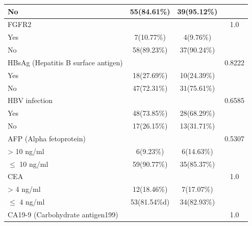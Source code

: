 \documentclass[num-refs]{wiley-article}
\begin{document}
\begin{table}[]
\begin{center}
\begin{tabular}{|l|c|c|c|}
\quad No                                             & 55(84.61\%)  & 39(95.12\%) &                         \\ \hline
FGFR2                                          &              &             & 1.0      \\ \cline{1-3}
\quad Yes                                            & 7(10.77\%)   & 4(9.76\%)   &                         \\ \cline{1-3}
\quad No                                             & 58(89.23\%)  & 37(90.24\%) &                         \\ \hline
HBsAg (Hepatitis B surface antigen)            &              &             & 0.8222 \\ \cline{1-3}
\quad Yes                                            & 18(27.69\%)  & 10(24.39\%) &                         \\ \cline{1-3}
\quad No                                             & 47(72.31\%)  & 31(75.61\%) &                         \\ \hline
HBV infection                                  &              &             & 0.6585 \\ \cline{1-3}
\quad Yes                                            & 48(73.85\%)  & 28(68.29\%) &                         \\ \cline{1-3}
\quad No                                             & 17(26.15\%)  & 13(31.71\%) &                         \\ \hline
AFP (Alpha   fetoprotein)                      &              &             & 0.5307 \\ \cline{1-3}
\quad \textgreater{} 10 ng/ml                         & 6(9.23\%)    & 6(14.63\%)  &                         \\ \cline{1-3}
\quad $\leq$ 10 ng/ml                                      & 59(90.77\%)  & 35(85.37\%) &                         \\ \hline
CEA                                            &              &             & 1.0      \\ \cline{1-3}
\quad \textgreater{} 4 ng/ml                          & 12(18.46\%)  & 7(17.07\%)  &                         \\ \cline{1-3}
\quad $\leq$ 4 ng/ml                                       & 53(81.54\%d) & 34(82.93\%) &                         \\ \hline
CA19-9   (Carbohydrate antigen199)              &              &             & 1.0      \\ \cline{1-3}

\end{tabular}
\end{center}
\end{table}
\end{document}
